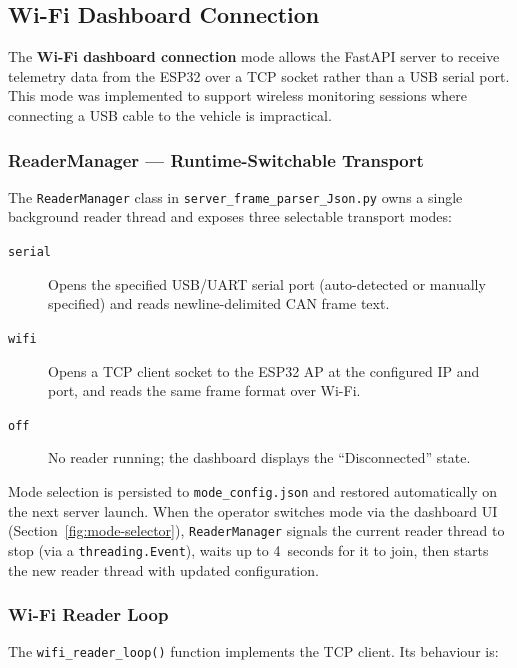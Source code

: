 \subsection{Wi-Fi Dashboard Connection}
\label{sec:wifi-dashboard}

The \textbf{Wi-Fi dashboard connection} mode allows the FastAPI server to receive telemetry data from the ESP32 over a TCP socket rather than a USB serial port. This mode was implemented to support wireless monitoring sessions where connecting a USB cable to the vehicle is impractical.

\subsubsection*{ReaderManager --- Runtime-Switchable Transport}

The \texttt{ReaderManager} class in \texttt{server\_frame\_parser\_Json.py} owns a single background reader thread and exposes three selectable transport modes:

\begin{description}
    \item[\texttt{serial}] Opens the specified USB/UART serial port (auto-detected or manually specified) and reads newline-delimited CAN frame text.
    \item[\texttt{wifi}] Opens a TCP client socket to the ESP32 AP at the configured IP and port, and reads the same frame format over Wi-Fi.
    \item[\texttt{off}] No reader running; the dashboard displays the ``Disconnected'' state.
\end{description}

Mode selection is persisted to \texttt{mode\_config.json} and restored automatically on the next server launch. When the operator switches mode via the dashboard UI (Section~\ref{fig:mode-selector}), \texttt{ReaderManager} signals the current reader thread to stop (via a \texttt{threading.Event}), waits up to 4~seconds for it to join, then starts the new reader thread with updated configuration.

\subsubsection*{Wi-Fi Reader Loop}

The \texttt{wifi\_reader\_loop()} function implements the TCP client. Its behaviour is:


